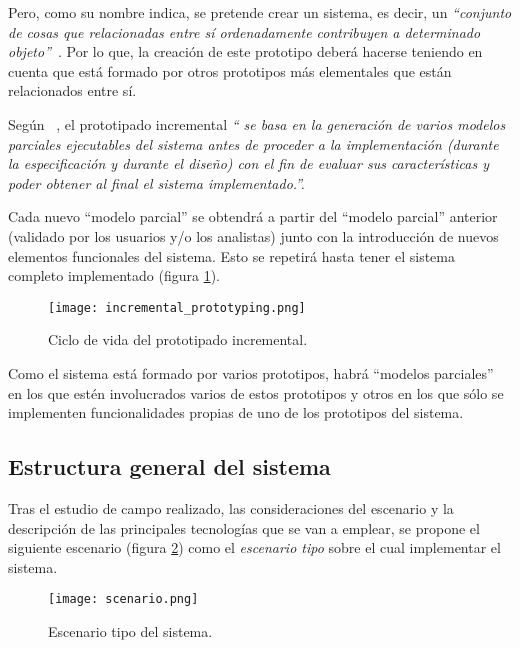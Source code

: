 Pero, como su nombre indica, se pretende crear un sistema, es decir, un
\emph{``conjunto de cosas que relacionadas entre sí ordenadamente contribuyen 
a determinado objeto''}~\cite{bib:rae}. Por lo que, la creación de este 
prototipo deberá hacerse teniendo en cuenta que está formado por otros 
prototipos más elementales que están relacionados entre sí.

Según ~\cite{bib:software_engineering}, el prototipado incremental \emph{``
se basa en la generación de varios modelos parciales ejecutables del sistema 
antes de proceder a la implementación (durante la especificación y durante el 
diseño) con el fin de evaluar sus características y poder obtener al final el 
sistema implementado.''.}

Cada nuevo ``modelo parcial'' se obtendrá a partir del ``modelo parcial''
anterior (validado por los usuarios y/o los analistas) junto con la
introducción de nuevos elementos funcionales del sistema. Esto se repetirá
hasta tener el sistema completo implementado (figura
\ref{fig:incremental_prototyping}).

\begin{figure}[!h]
  \begin{center}
    \texttt{[image: incremental\_prototyping.png]}
    \caption{Ciclo de vida del prototipado incremental.}
    \label{fig:incremental_prototyping}
  \end{center}
\end{figure}

Como el sistema está formado por varios prototipos, habrá ``modelos parciales''
en los que estén involucrados varios de estos prototipos y otros en los que
sólo se implementen funcionalidades propias de uno de los prototipos del
sistema.

  \subsection{Estructura general del sistema}
Tras el estudio de campo realizado, las consideraciones del escenario y la
descripción de las principales tecnologías que se van a emplear, se propone
el siguiente escenario (figura \ref{fig:scenario}) como el \emph{escenario
tipo} sobre el cual implementar el sistema.

\begin{figure}[!h]
  \begin{center}
    \texttt{[image: scenario.png]}
    \caption{Escenario tipo del sistema.}
    \label{fig:scenario}
  \end{center}
\end{figure}

